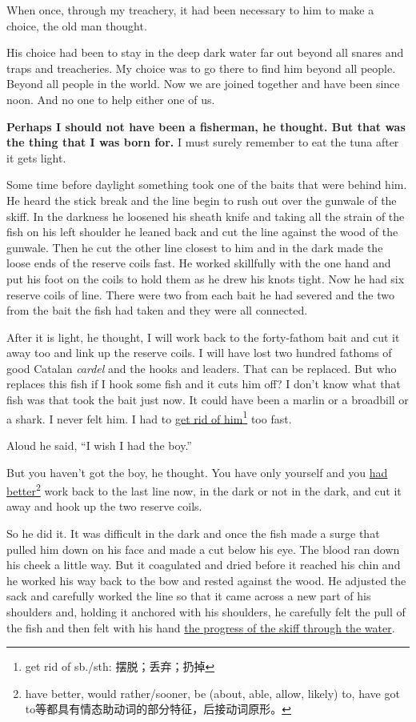 When once, through my \gls{treachery}, it had been necessary to him to make a
choice, the old man thought.

His choice had been to stay in the deep dark water far out \gls{beyond} all
\glspl{snare} and \glspl{trap} and treacheries. My choice was to go
there to find him beyond all people. Beyond all people in the world. Now we
are joined together and have been since noon. And no one to help \gls{either} one
of us.

\textbf{Perhaps I should not have been a fisherman, he thought. But that was the
thing that I was born for.} I must surely remember to eat the tuna after it
gets light.

Some time before daylight something took one of the baits that were behind
him. He heard the stick break and the line begin to rush out over the
\gls{gunwale} of the skiff. In the darkness he \gls{loosened} his
\gls{sheath} knife and taking all the strain of the fish on his left
shoulder he leaned back and cut the line against the wood of the gunwale.
Then he cut the other line closest to him and in the dark made the
\gls{loose} ends of the reserve coils fast. He worked \gls{skillfully} with
the one hand and put his foot on the coils to hold them as he \gls{drew} his
\glspl{knot} tight. Now he had six reserve coils of line. There were two
from each bait he had severed and the two from the bait the fish had taken
and they were all connected.

After it is light, he thought, I will work back to the forty-fathom bait and
cut it away too and link up the reserve coils. I will have lost two hundred
fathoms of good Catalan \emph{cardel} and the hooks and leaders. That can be
replaced. But who replaces this fish if I hook some fish and it cuts him
off? I don't know what that fish was that took the bait just now. It could
have been a marlin or a broadbill or a shark. I never felt him. I had to \uline{get
rid of him}\footnote{get rid of sb./sth: 摆脱；丢弃；扔掉} too fast.

Aloud he said, ``I wish I had the boy.''

But you haven't got the boy, he thought. You have only yourself and you
\uline{had better}\footnote{have better, would rather/sooner, be (about, able,
  allow, likely) to, have got to等都具有情态助动词的部分特征，后接动词原形。}
work back to the last line now, in the dark or not in the dark, and cut it
away and hook up the two reserve coils.

So he did it. It was difficult in the dark and once the fish made a
\gls{surge} that pulled him down on his face and made a cut below his eye.
The blood ran down his cheek a little way. But it \gls{coagulated} and dried
before it reached his \gls{chin} and he worked his way back to the bow and
rested against the wood. He \gls{adjusted} the sack and carefully worked the
line so that it came across a new part of his shoulders and, holding it
\gls{anchored} with his shoulders, he carefully felt the pull of the fish and
then felt with his hand \uline{the \gls{progress} of the skiff through the water}.

